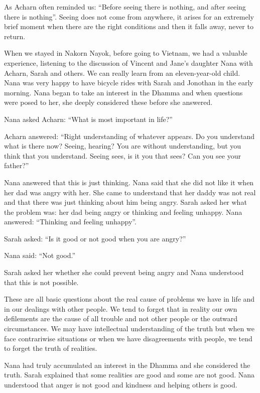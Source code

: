 As Acharn often reminded us: ``Before seeing there is nothing, and after
seeing there is nothing''. Seeing does not come from anywhere, it arises
for an extremely brief moment when there are the right conditions and
then it falls away, never to return.

When we stayed in Nakorn Nayok, before going to Vietnam, we had a
valuable experience, listening to the discussion of Vincent and Jane's
daughter Nana with Acharn, Sarah and others. We can really learn from an
eleven-year-old child. Nana was very happy to have bicycle rides with
Sarah and Jonothan in the early morning. Nana began to take an interest
in the Dhamma and when questions were posed to her, she deeply
considered these before she answered.

Nana asked Acharn: ``What is most important in life?''

Acharn answered: ``Right understanding of whatever appears. Do you
understand what is there now? Seeing, hearing? You are without
understanding, but you think that you understand. Seeing sees, is it you
that sees? Can you see your father?''

Nana answered that this is just thinking. Nana said that she did not
like it when her dad was angry with her. She came to understand that her
daddy was not real and that there was just thinking about him being
angry. Sarah asked her what the problem was: her dad being angry or
thinking and feeling unhappy. Nana answered: ``Thinking and feeling
unhappy''.

Sarah asked: ``Is it good or not good when you are angry?''

Nana said: ``Not good.''

Sarah asked her whether she could prevent being angry and Nana
understood that this is not possible.

These are all basic questions about the real cause of problems we have
in life and in our dealings with other people. We tend to forget that in
reality our own defilements are the cause of all trouble and not other
people or the outward circumstances. We may have intellectual
understanding of the truth but when we face contrariwise situations or
when we have disagreements with people, we tend to forget the truth of
realities.

Nana had truly accumulated an interest in the Dhamma and she considered
the truth. Sarah explained that some realities are good and some are not
good. Nana understood that anger is not good and kindness and helping
others is good.

